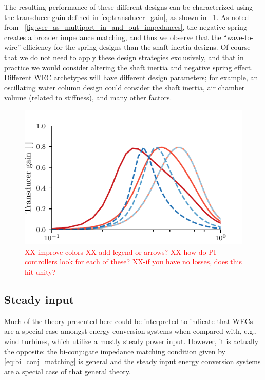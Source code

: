\documentclass[lettersize,journal]{IEEEtran}
\newcommand{\rc}[1]{\textcolor{red}{#1}}
\begin{document}
The resulting performance of these different designs can be characterized using the transducer gain defined in \eqref{eq:transducer_gain}, as shown in \figurename~\ref{fig:wec_as_multiport_spring_inertia_transducer_gains}.
As noted from \figurename~\ref{fig:wec_as_multiport_in_and_out_impedances}, the negative spring creates a broader impedance matching, and thus we observe that the ``wave-to-wire'' efficiency for the spring designs than the shaft inertia designs.
Of course that we do not need to apply these design strategies exclusively, and that in practice we would consider altering the shaft inertia and negative spring effect.
Different WEC archetypes will have different design parameters; for example, an oscillating water column design could consider the shaft inertia, air chamber volume (related to stiffness), and many other factors.

\begin{figure}[tb]
        \centering
        \includegraphics[width=1\columnwidth]{wec_as_multiport_spring_inertia_transducer_gains.pdf}
        \caption{\rc{XX-improve colors} \rc{XX-add legend or arrows?} \rc{XX-how do PI controllers look for each of these?} \rc{XX-if you have no losses, does this hit unity?}}
        \label{fig:wec_as_multiport_spring_inertia_transducer_gains}
\end{figure}

\subsection{Steady input}\label{sec:steady_input}
Much of the theory presented here could be interpreted to indicate that WECs are a special case amongst energy conversion systems when compared with, e.g., wind turbines, which utilize a mostly steady power input.
However, it is actually the opposite: the bi-conjugate impedance matching condition given by \eqref{eq:bi_conj_matching} is general and the steady input energy conversion systems are a special case of that general theory.
\end{document}

